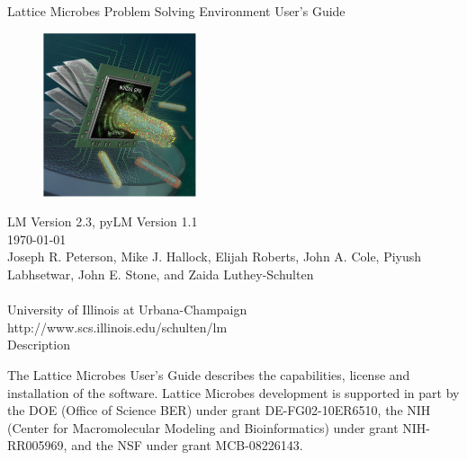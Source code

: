 \documentclass[12pt]{report}
\begin{document}
\newpage
\singlespacing
\normalsize
\setcounter{page}{1}
\renewcommand{\thepage}{\roman{page}}

\thispagestyle{empty}
\begin{center}{
\vspace*{0.6in}
{\huge Lattice Microbes Problem Solving Environment User's Guide}\\
\vspace*{0.2in}
\begin{figure}[h!]
  \centering
      \includegraphics[width=0.4\textwidth]{Figures/lm.pdf}
\end{figure}
\vspace*{0.15in}
{\large LM Version 2.3, pyLM Version 1.1}\\
{\large \today}\\
\vspace*{0.5in}
{\large Joseph R. Peterson, Mike J. Hallock, Elijah Roberts, John A. Cole, Piyush Labhsetwar, John E. Stone, and Zaida Luthey-Schulten}\\
~\\
{\large University of Illinois at Urbana-Champaign}\\
{\large http://www.scs.illinois.edu/schulten/lm}\\
\vspace*{0.4in}
{\Large Description}\\
}\end{center}

The Lattice Microbes User's Guide describes the capabilities, license and installation of the software. Lattice Microbes development is supported in part by the DOE (Office of Science BER) under grant DE-FG02-10ER6510, the NIH (Center for Macromolecular Modeling and Bioinformatics) under grant NIH-RR005969, and the NSF under grant MCB-08226143.
\end{document}

